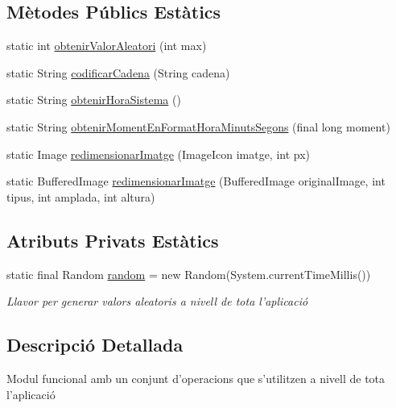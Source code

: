 \subsection*{Mètodes Públics Estàtics}
\begin{DoxyCompactItemize}
\item 
static int \hyperlink{classlogica_1_1_utils_a9b70eb7cd5d0abf2938c68baa3034894}{obtenir\+Valor\+Aleatori} (int max)
\item 
static String \hyperlink{classlogica_1_1_utils_a66b968a61334d9723942ad3a9e621fbd}{codificar\+Cadena} (String cadena)
\item 
static String \hyperlink{classlogica_1_1_utils_aaf9d9b176acc66d9c2e9ba977a22f414}{obtenir\+Hora\+Sistema} ()
\item 
static String \hyperlink{classlogica_1_1_utils_a621092fb3c75d5fc727ed3708ee00f24}{obtenir\+Moment\+En\+Format\+Hora\+Minuts\+Segons} (final long moment)
\item 
static Image \hyperlink{classlogica_1_1_utils_a5c0e404e667ec5f7fdac6a244b224098}{redimensionar\+Imatge} (Image\+Icon imatge, int px)
\item 
static Buffered\+Image \hyperlink{classlogica_1_1_utils_aaf930ea3e64076e1058757013226f044}{redimensionar\+Imatge} (Buffered\+Image original\+Image, int tipus, int amplada, int altura)
\end{DoxyCompactItemize}
\subsection*{Atributs Privats Estàtics}
\begin{DoxyCompactItemize}
\item 
\hypertarget{classlogica_1_1_utils_adc9eb4b869cd26ba31978a43ff71f80f}{static final Random \hyperlink{classlogica_1_1_utils_adc9eb4b869cd26ba31978a43ff71f80f}{random} = new Random(System.\+current\+Time\+Millis())}\label{classlogica_1_1_utils_adc9eb4b869cd26ba31978a43ff71f80f}

\begin{DoxyCompactList}\small\item\em Llavor per generar valors aleatoris a nivell de tota l'aplicació \end{DoxyCompactList}\end{DoxyCompactItemize}


\subsection{Descripció Detallada}
Modul funcional amb un conjunt d'operacions que s'utilitzen a nivell de tota l'aplicació 

